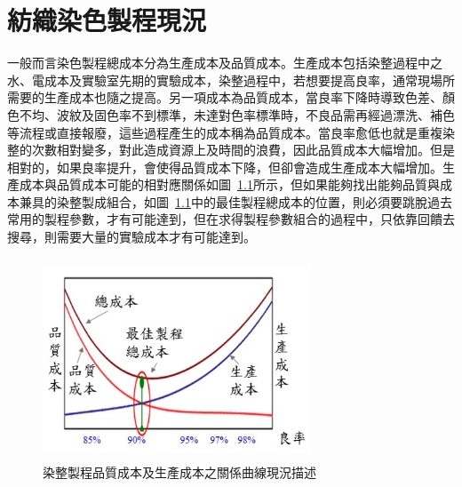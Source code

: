 \chapter{紡織染色製程現況}
\label{c:description}
一般而言染色製程總成本分為生產成本及品質成本。生產成本包括染整過程中之水、電成本及實驗室先期的實驗成本，染整過程中，若想要提高良率，通常現場所需要的生產成本也隨之提高。另一項成本為品質成本，當良率下降時導致色差、顏色不均、波紋及固色率不到標準，未達對色率標準時，不良品需再經過漂洗、補色等流程或直接報廢，這些過程產生的成本稱為品質成本。當良率愈低也就是重複染整的次數相對變多，對此造成資源上及時間的浪費，因此品質成本大幅增加。但是相對的，如果良率提升，會使得品質成本下降，但卻會造成生產成本大幅增加。生產成本與品質成本可能的相對應關係如圖~\ref{fig:graph1}所示，但如果能夠找出能夠品質與成本兼具的染整製成組合，如圖~\ref{fig:graph1}中的最佳製程總成本的位置，則必須要跳脫過去常用的製程參數，才有可能達到，但在求得製程參數組合的過程中，只依靠回饋去搜尋，則需要大量的實驗成本才有可能達到。
\begin{figure} 
\centering  
\includegraphics[width=8cm,height=6cm]{Graph/graph1.png}
\caption{染整製程品質成本及生產成本之關係曲線現況描述}
\label{fig:graph1}
\end{figure}